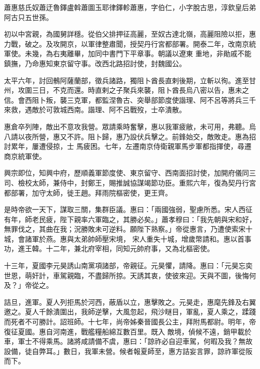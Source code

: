 
\begin{pinyinscope}

 蕭惠慈氏奴蕭迂魯鐸盧斡蕭圖玉耶律鐸軫蕭惠，字伯仁，小字脫古思，淳欽皇后弟阿古只五世孫。



 初以中宮親，為國舅詳穩。從伯父排押征高麗，至奴古達北嶺，高麗阻險以拒，惠力戰，破之。及攻開京，以軍律整肅聞，授契丹行宮都部署。開泰二年，改南京統軍使。未幾，為右夷離畢，加同中書門下平章事。朝議以遼東
 重地，非勛戚不能鎮撫，乃命惠知東京留守事。改西北路招討使，封魏國公。



 太平六年，討回鶻阿薩蘭部，徵兵諸路，獨阻卜酋長直剌後期，立斬以徇。進至甘州，攻圍三日，不克而還。時直剌之子聚兵來襲，阻卜酋長烏八密以告，惠未之信。會西阻卜叛，襲三克軍，都監涅魯古、突舉部節度使諧理、阿不呂等將兵三千來救，遇敵於可敦城西南。諧理、阿不呂戰歿，士卒潰散。



 惠倉卒列陣，敵出不意攻我營。眾請乘時奮擊，惠以我軍疲敝，未可用，弗聽。烏八請以夜所營，惠又不許。阻卜歸，惠乃設伏兵擊之。前鋒始交，敵敗走。惠為招討累年，屢遭侵掠，士
 馬疲困。七年，左遷南京侍衛親軍馬步軍都指揮使，尋遷商京統軍使。



 興宗即位，知興中府，歷順義軍節度使、東京留守、西南面招討使，加開府儀同三司、檢校太師，兼侍中，封鄭王，賜推誠協謀竭節功臣。重熙六年，復為契丹行宮都部署，加守太師，徙王趙。拜雨院樞密使，更王齊。



 是時帝欲一天下，謀取三關，集群臣議。惠曰：「兩國強弱，聖慮所悉。宋人西征有年，師老民疲，陛下親率六軍臨之，其勝必矣。」蕭孝穆曰：「我先朝與宋和好，無罪伐之，其曲在我；況勝敗未可逆料。願陛下熟察。」帝從惠言，乃遭使索宋十城，會諸軍於燕。惠與太弟帥師壓宋境，
 宋人重失十城，增歲幣請和。惠以首事功，進王韓。十二年，兼北府宰相，同知元帥府事，又為北樞密使。



 十三年，夏國李元昊誘山南黨項諸部，帝親征。元昊懼，請降。惠曰：「元昊忘奕世恩，萌奸計，車駕親臨，不盡歸所掠。天誘其衷，使彼來迎。天與不圖，後悔何及？」帝從之。



 詰旦，進軍。夏人列拒馬於河西，蔽盾以立，惠擊敗之。元昊走，惠麾先鋒及右翼邀之。夏人千餘潰圍出，我師逆擊，大風忽起，飛沙瞇目，軍亂，夏人乘之，蹂踐而死者不可勝計。詔班師。十七年，尚帝姊秦晉國長公主，拜附馬都尉。明年，帝復征夏國。惠自河南進，戰艦糧船綿互數百里。既入
 敵境，偵候不遠，銷甲載於車，軍士不得乘馬。諸將咸請備不虞，惠曰：「諒祚必自迎車駕，何暇及我？無故設備，徒自弊耳。」數日，我軍未營。候者報夏師至，惠方詰妄言罪，諒祚軍從阪而下。




\end{pinyinscope}
